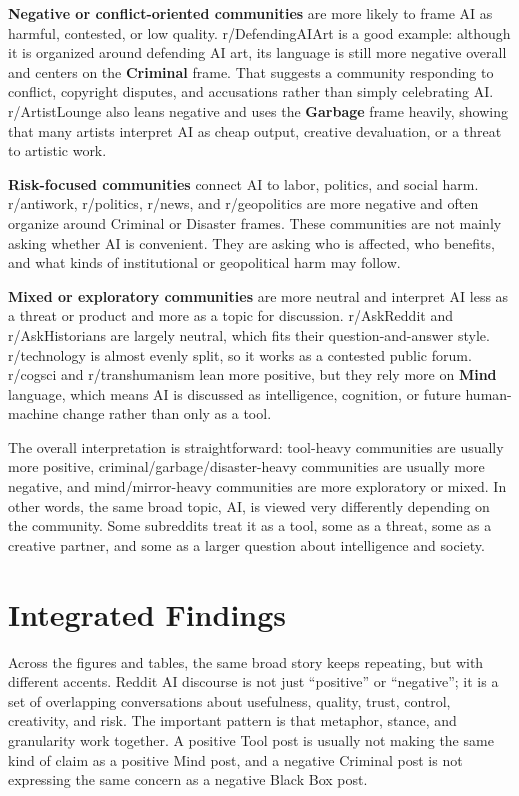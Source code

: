 \documentclass[11pt]{article}
\begin{document}
\textbf{Negative or conflict-oriented communities} are more likely to frame AI as harmful, contested, or low quality. r/DefendingAIArt is a good example: although it is organized around defending AI art, its language is still more negative overall and centers on the \textbf{Criminal} frame. That suggests a community responding to conflict, copyright disputes, and accusations rather than simply celebrating AI. r/ArtistLounge also leans negative and uses the \textbf{Garbage} frame heavily, showing that many artists interpret AI as cheap output, creative devaluation, or a threat to artistic work.

\textbf{Risk-focused communities} connect AI to labor, politics, and social harm. r/antiwork, r/politics, r/news, and r/geopolitics are more negative and often organize around Criminal or Disaster frames. These communities are not mainly asking whether AI is convenient. They are asking who is affected, who benefits, and what kinds of institutional or geopolitical harm may follow.

\textbf{Mixed or exploratory communities} are more neutral and interpret AI less as a threat or product and more as a topic for discussion. r/AskReddit and r/AskHistorians are largely neutral, which fits their question-and-answer style. r/technology is almost evenly split, so it works as a contested public forum. r/cogsci and r/transhumanism lean more positive, but they rely more on \textbf{Mind} language, which means AI is discussed as intelligence, cognition, or future human-machine change rather than only as a tool.

The overall interpretation is straightforward: tool-heavy communities are usually more positive, criminal/garbage/disaster-heavy communities are usually more negative, and mind/mirror-heavy communities are more exploratory or mixed. In other words, the same broad topic, AI, is viewed very differently depending on the community. Some subreddits treat it as a tool, some as a threat, some as a creative partner, and some as a larger question about intelligence and society.

\section{Integrated Findings}
Across the figures and tables, the same broad story keeps repeating, but with different accents. Reddit AI discourse is not just ``positive'' or ``negative''; it is a set of overlapping conversations about usefulness, quality, trust, control, creativity, and risk. The important pattern is that metaphor, stance, and granularity work together. A positive Tool post is usually not making the same kind of claim as a positive Mind post, and a negative Criminal post is not expressing the same concern as a negative Black Box post.
\end{document}
